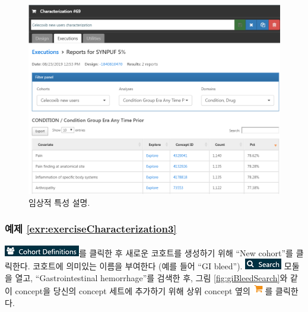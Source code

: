 \documentclass[11pt]{book}
\theoremstyle{definition}
\theoremstyle{definition}
\theoremstyle{definition}
\theoremstyle{remark}
\begin{document}
\begin{figure}

{\centering \includegraphics[width=1\linewidth]{images/SuggestedAnswers/celecoxibCharacterizationResults} 

}

\caption{임상적 특성 설명.}\label{fig:celecoxibCharacterizationResults}
\end{figure}

\subsubsection*{예제
\ref{exr:exerciseCharacterization3}}\label{-refexrexercisecharacterization3}

\includegraphics{images/Cohorts/cohortdefinition.png}를 클릭한 후 새로운
코호트를 생성하기 위해 ``New cohort''를 클릭한다. 코호트에 의미있는
이름을 부여한다 (예를 들어 ``GI bleed'').
\includegraphics{images/Cohorts/search-2.png} 모둘을 열고,
``Gastrointestinal hemorrhage''를 검색한 후, 그림
\ref{fig:giBleedSearch}와 같이 concept을 당신의 concept 세트에 추가하기
위해 상위 concept 옆의
\includegraphics{images/Cohorts/shoppingcart.png}를 클릭한다.
\end{document}

